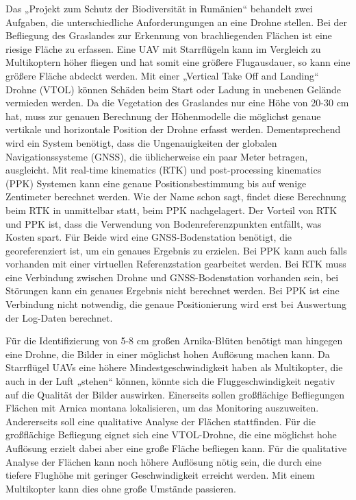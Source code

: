 Das „Projekt zum Schutz der Biodiversität in Rumänien“ behandelt zwei Aufgaben, die unterschiedliche Anforderungungen an eine Drohne stellen. Bei der Befliegung des Graslandes zur Erkennung von brachliegenden Flächen ist eine riesige Fläche zu erfassen. Eine UAV mit Starrflügeln kann im Vergleich zu Multikoptern höher fliegen und hat somit eine größere Flugausdauer, so kann eine größere Fläche abdeckt werden. Mit einer „Vertical Take Off and Landing“ Drohne (VTOL) können Schäden beim Start oder Ladung in unebenen Gelände vermieden werden. Da die Vegetation des Graslandes nur eine Höhe von 20-30 cm hat, muss zur genauen Berechnung der Höhenmodelle die möglichst genaue vertikale und horizontale Position der Drohne erfasst werden. Dementsprechend wird ein System  benötigt, dass die Ungenauigkeiten der globalen Navigationssysteme (GNSS), die üblicherweise ein paar Meter betragen, ausgleicht. Mit real-time kinematics (RTK) und post-processing kinematics (PPK) Systemen kann eine genaue Positionsbestimmung bis auf wenige Zentimeter berechnet werden. Wie der Name schon sagt, findet diese Berechnung beim RTK in unmittelbar statt, beim PPK nachgelagert. 
Der Vorteil von RTK und PPK ist, dass die Verwendung von Bodenreferenzpunkten entfällt, was Kosten spart. Für Beide wird eine GNSS-Bodenstation benötigt, die georeferenziert ist, um ein genaues Ergebnis zu erzielen. Bei PPK kann auch falls vorhanden mit einer virtuellen Referenzstation gearbeitet werden. Bei RTK muss eine Verbindung zwischen Drohne und GNSS-Bodenstation vorhanden sein, bei Störungen kann ein genaues Ergebnis nicht berechnet werden. Bei PPK ist eine Verbindung nicht notwendig, die genaue Positionierung wird erst bei Auswertung der Log-Daten berechnet. 

Für die Identifizierung von 5-8 cm großen Arnika-Blüten benötigt man hingegen eine Drohne, die Bilder in einer möglichst hohen Auflösung machen kann. Da Starrflügel UAVs eine höhere Mindestgeschwindigkeit haben als Multikopter, die auch in der Luft „stehen“ können, könnte sich die Fluggeschwindigkeit negativ auf die Qualität der Bilder auswirken. Einerseits sollen großflächige Befliegungen Flächen mit Arnica montana lokalisieren, um das Monitoring auszuweiten. Andererseits soll eine qualitative Analyse der Flächen stattfinden. Für die großflächige Befliegung eignet sich eine VTOL-Drohne, die eine möglichst hohe Auflösung erzielt dabei aber eine große Fläche befliegen kann. Für die qualitative Analyse der Flächen kann noch höhere Auflösung nötig sein, die durch eine tiefere Flughöhe mit geringer Geschwindigkeit erreicht werden. Mit einem Multikopter kann dies ohne große Umstände passieren.

